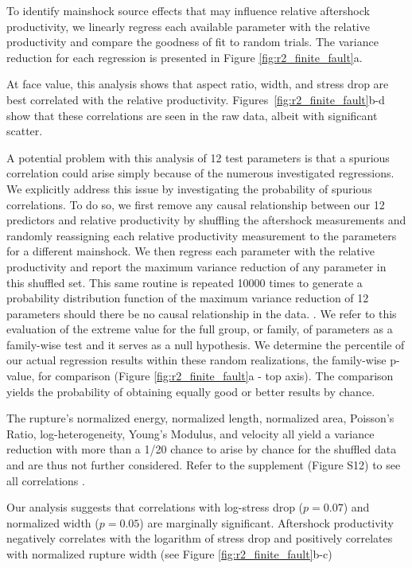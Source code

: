 \documentclass[draft, jgrga]{agujournal2018}
\begin{document}
    To identify mainshock source effects that may influence relative aftershock productivity, we linearly regress each available parameter with the relative productivity and compare the goodness of fit to random trials. The variance reduction for each regression is presented in Figure \ref{fig:r2_finite_fault}a.

    At face value, this analysis shows that aspect ratio, width, and stress drop are best correlated with the relative productivity. Figures~\ref{fig:r2_finite_fault}b-d show that these correlations are seen in the raw data, albeit with significant scatter.

    A potential problem with this analysis of 12 test parameters is that a spurious correlation could arise simply because of the numerous investigated regressions. We explicitly address this issue by investigating the probability of spurious correlations. To do so, we first remove any causal relationship between our 12 predictors and relative productivity by shuffling the aftershock measurements and randomly reassigning each relative productivity measurement to the parameters for a different mainshock. We then regress each parameter with the relative productivity and report the maximum variance reduction of any parameter in this shuffled set. This same routine is repeated 10000 times to generate a probability distribution function of the maximum variance reduction of 12 parameters should there be no causal relationship in the data. . We refer to this evaluation of the extreme value for the full group, or family, of parameters as a family-wise test and it serves as a  null hypothesis. We determine the percentile of our actual regression results within these random realizations, the family-wise p-value, for comparison (Figure \ref{fig:r2_finite_fault}a - top axis).  The comparison yields the probability of obtaining equally good or better results by chance.

    The rupture's normalized energy, normalized length, normalized area, Poisson's Ratio, log-heterogeneity, Young's Modulus, and velocity all yield a variance reduction with more than a 1/20 chance to arise by chance for the shuffled data and are thus not further considered. Refer to the supplement (Figure S12) to see all correlations \citep{Convers2011GlobalMid2010, Hayes2017}.



    Our analysis suggests that correlations with log-stress drop ($p = 0.07$) and normalized width ($p = 0.05$) are mar\-gi\-nally significant. Aftershock productivity negatively correlates with the logarithm of stress drop and positively correlates with normalized rupture width (see Figure \ref{fig:r2_finite_fault}b-c)
\end{document}

